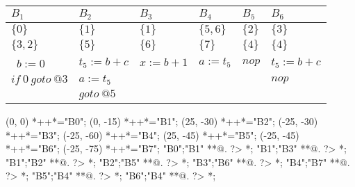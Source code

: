 \begin{table}[ht]
\begin{scriptsize}
\begin{tabular}{l|l|l|l|l|l}
$B_{1}$ & $B_{2}$ & $B_{3}$ & $B_{4}$ & $B_{5}$ & $B_{6}$ \\
\hline
$\{0\}$ & $\{1\}$ & $\{1\}$ & $\{5, 6\}$ & $\{2\}$ & $\{3\}$ \\
$\{3, 2\}$ & $\{5\}$ & $\{6\}$ & $\{7\}$ & $\{4\}$ & $\{4\}$ \\
\hline\
$b:=0$ & $t_{5}:=b+c$ & $x:=b+1$ & $a:=t_{5}$ & $nop$ & $t_{5}:=b+c$ \\
$if\:0\:goto\:@3$ & $a:=t_{5}$ &  &  &  & $nop$ \\
 & $goto\:@5$ &  &  &  &  \\
\end{tabular}
\end{scriptsize}
\end{table}

\begin{scriptsize}
\xy(0, 0)
	*++{}*\frm{-,}="B0";
(0, -15)
	*++{}*\frm{-,}="B1";
(25, -30)
	*++{}*\frm{-,}="B2";
(-25, -30)
	*++{}*\frm{-,}="B3";
(-25, -60)
	*++{}*\frm{-,}="B4";
(25, -45)
	*++{}*\frm{-,}="B5";
(-25, -45)
	*++{}*\frm{-,}="B6";
(-25, -75)
	*++{}*\frm{-,}="B7";
"B0";"B1" **@{.} ?> *{\dir{>}};
"B1";"B3" **@{.} ?> *{\dir{>}};
"B1";"B2" **@{.} ?> *{\dir{>}};
"B2";"B5" **@{.} ?> *{\dir{>}};
"B3";"B6" **@{.} ?> *{\dir{>}};
"B4";"B7" **@{.} ?> *{\dir{>}};
"B5";"B4" **@{.} ?> *{\dir{>}};
"B6";"B4" **@{.} ?> *{\dir{>}};
\endxy
\end{scriptsize}


